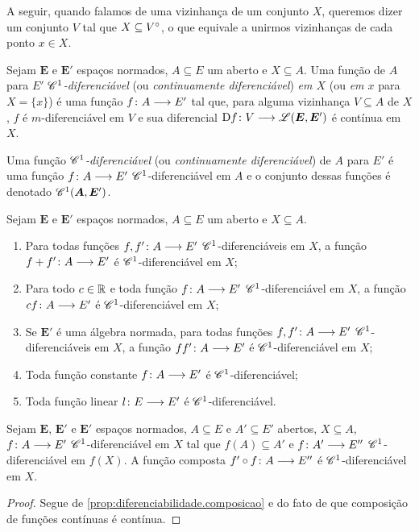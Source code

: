 A seguir, quando falamos de uma vizinhança de um conjunto $X$, queremos dizer um conjunto $V$ tal que $X \subseteq {V}^\circ$, o que equivale a unirmos vizinhanças de cada ponto $x \in X$.

\begin{definition}
Sejam $\bm E$ e $\bm E'$ espaços normados, $A \subseteq E$ um aberto e $X \subseteq A$. Uma função de $A$ para $E'$ \emph{$\mathscr{C}^1$-diferenciável} (ou \emph{continuamente diferenciável}) \emph{em $X$} (ou \emph{em $x$} para $X = \{x\}$) é uma função ${f}\colon {A} \longrightarrow {E'}$ tal que, para alguma vizinhança $V \subseteq A$ de $X$, $f$ é $m$-diferenciável em $V$ e sua diferencial ${\mathrm{D} f}\colon {V} \longrightarrow {\mathscr{L}(\bm E, \bm E')}$ é contínua em $X$.

Uma função \emph{$\mathscr{C}^1$-diferenciável} (ou \emph{continuamente diferenciável}) de $A$ para $E'$ é uma função ${f}\colon {A} \longrightarrow {E'}$ $\mathscr{C}^1$-diferenciável em $A$ e o conjunto dessas funções é denotado $\mathscr{C}^1(\bm A,\bm E')$.
\end{definition}


\begin{exercise}
\label{prop:diferencial.continua.propriedades}
Sejam $\bm E$ e $\bm E'$ espaços normados, $A \subseteq E$ um aberto e $X \subseteq A$.
	\begin{enumerate}
	\item Para todas funções ${f,f'}\colon {A} \longrightarrow {E'}$ $\mathscr{C}^1$-diferenciáveis em $X$, a função ${f+f'}\colon {A} \longrightarrow {E'}$ é $\mathscr{C}^1$-diferenciável em $X$;
	\item Para todo $c \in \mathbb{R}$ e toda função ${f}\colon {A} \longrightarrow {E'}$ $\mathscr{C}^1$-diferenciável em $X$, a função ${c f}\colon {A} \longrightarrow {E'}$ é $\mathscr{C}^1$-diferenciável em $X$;
	\item Se $\bm E'$ é uma álgebra normada, para todas funções ${f,f'}\colon {A} \longrightarrow {E'}$ $\mathscr{C}^1$-diferenciáveis em $X$, a função ${f f'}\colon {A} \longrightarrow {E'}$ é $\mathscr{C}^1$-diferenciável em $X$;
	\item Toda função constante ${f}\colon {A} \longrightarrow {E'}$ é $\mathscr{C}^1$-diferenciável;
	\item Toda função linear ${l}\colon {E} \longrightarrow {E'}$ é $\mathscr{C}^1$-diferenciável.
	\end{enumerate}
\end{exercise}

\begin{proposition}
\label{prop:diferenciabilidade.continua.composicao}
Sejam $\bm E$, $\bm E'$ e $\bm E'$ espaços normados, $A \subseteq E$ e $A' \subseteq E'$ abertos, $X \subseteq A$, ${f}\colon {A} \longrightarrow {E'}$ $\mathscr{C}^1$-diferenciável em $X$ tal que $f(A) \subseteq A'$ e ${f}\colon {A'} \longrightarrow {E''}$ $\mathscr{C}^1$-diferenciável em $f(X)$. A função composta ${f' \circ f}\colon {A} \longrightarrow {E''}$ é $\mathscr{C}^1$-diferenciável em $X$.
\end{proposition}
\begin{proof}
Segue de \ref{prop:diferenciabilidade.composicao} e do fato de que composição de funções contínuas é contínua.
\end{proof}



